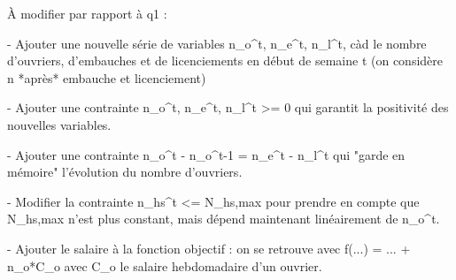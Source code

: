 À modifier par rapport à q1 :

- Ajouter une nouvelle série de variables n_o^t, n_e^t, n_l^t, càd le nombre
  d'ouvriers, d'embauches et de licenciements en début de semaine t (on
  considère n *après* embauche et licenciement)

- Ajouter une contrainte
    n_o^t, n_e^t, n_l^t >= 0
  qui garantit la positivité des nouvelles variables.

- Ajouter une contrainte
    n_o^t - n_o^{t-1} = n_e^t - n_l^t
  qui "garde en mémoire" l'évolution du nombre d'ouvriers.

- Modifier la contrainte
    n_hs^t <= N_{hs,max}
  pour prendre en compte que N_{hs,max} n'est plus constant, mais dépend
  maintenant linéairement de n_o^t.

- Ajouter le salaire à la fonction objectif : on se retrouve avec
    f(...) = ... + n_o*C_o
  avec C_o le salaire hebdomadaire d'un ouvrier.
